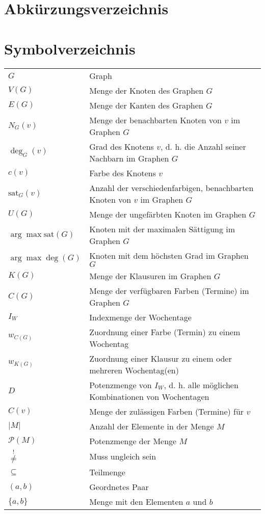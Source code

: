 \newpage
\section*{Abkürzungsverzeichnis}
\printnoidxglossaries

\newpage
\section*{Symbolverzeichnis}
\begin{tabular}{ll}
\( G \) & Graph \\[5pt]
\( V(G) \) & Menge der Knoten des Graphen \( G \) \\[5pt]
\( E(G) \) & Menge der Kanten des Graphen \( G \) \\[5pt]
\( N_G(v) \) & Menge der benachbarten Knoten von \( v \) im Graphen \( G \) \\[5pt]
\( \deg_G(v) \) & Grad des Knotens \( v \), \acrshort{d. h.} die Anzahl seiner Nachbarn im Graphen \( G \) \\[5pt]
\( c(v) \) & Farbe des Knotens \( v \) \\[5pt]
\( \text{sat}_G(v) \) & Anzahl der verschiedenfarbigen, benachbarten Knoten von \( v \) im Graphen \( G \) \\[5pt]
\( U(G) \) & Menge der ungefärbten Knoten im Graphen \( G \) \\[5pt]
\( \arg\max \text{sat}(G) \) & Knoten mit der maximalen Sättigung im Graphen \( G \) \\[5pt]
\( \arg\max \deg(G) \) & Knoten mit dem höchsten Grad im Graphen \( G \) \\[5pt]
\( K(G) \) & Menge der Klausuren im Graphen \( G \) \\[5pt]
\( C(G) \) & Menge der verfügbaren Farben (Termine) im Graphen \( G \) \\[5pt]
\( I_W \) & Indexmenge der Wochentage \\[5pt]
\( w_{C(G)} \) & Zuordnung einer Farbe (Termin) zu einem Wochentag \\[5pt]
\( w_{K(G)} \) & Zuordnung einer Klausur zu einem oder mehreren Wochentag(en) \\[5pt]
\( D \) & Potenzmenge von $I_W$, \acrshort{d. h.} alle möglichen Kombinationen von Wochentagen\\[5pt]
\( C(v) \) & Menge der zulässigen Farben (Termine) für \( v \) \\[5pt]
\( |M| \) & Anzahl der Elemente in der Menge \( M \) \\[5pt]
\( \mathcal{P}(M) \) & Potenzmenge der Menge \( M \) \\[5pt]
\( \overset{!}{\neq} \) & Muss ungleich sein \\[5pt]
\( \subseteq \) & Teilmenge \\[5pt]
\( (a,b) \) & Geordnetes Paar \\[5pt]
\( \{a,b\} \) & Menge mit den Elementen $a$ und $b$ \\[5pt]
\end{tabular}
